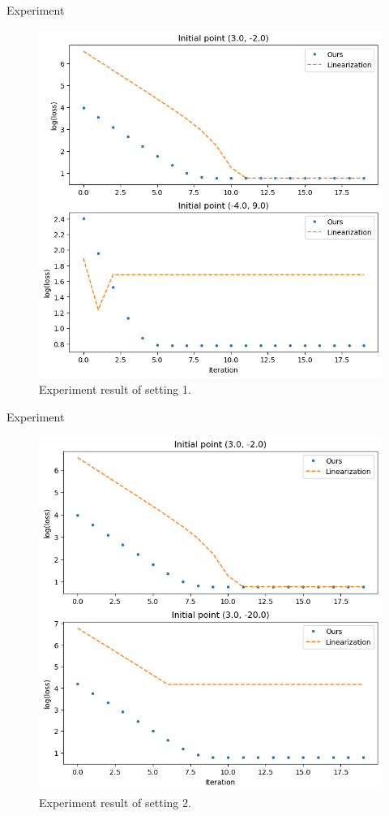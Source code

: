 \documentclass{beamer}
\begin{document}
\begin{frame}{Experiment}
    \begin{figure}[htbp]
    \centerline{\includegraphics [scale=0.3]{./fig/setting1.png}}
    \caption{Experiment result of setting 1.}
    \label{fig1}
    \end{figure}
\end{frame}

\begin{frame}{Experiment}
    \begin{figure}[htbp]
    \centerline{\includegraphics [scale=0.3]{./fig/setting2.png}}
    \caption{Experiment result of setting 2.}
    \label{fig2}
    \end{figure}
\end{frame}
\end{document}
